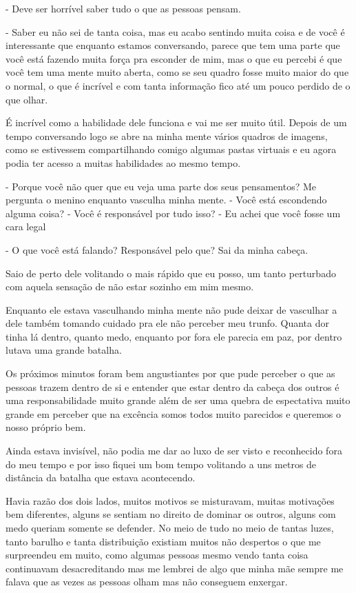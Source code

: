 - Deve ser horrível saber tudo o que as pessoas pensam.

- Saber eu não sei de tanta coisa, mas eu acabo sentindo muita coisa e de você é interessante que enquanto estamos conversando, parece que tem uma parte que você está fazendo muita força pra esconder de mim, mas o que eu percebi é que você tem uma mente muito aberta, como se seu quadro fosse muito maior do que o normal, o que é incrível e com tanta informação fico até um pouco perdido de o que olhar.

É incrível como a habilidade dele funciona e vai me ser muito útil. Depois de um tempo conversando logo se abre na minha mente vários quadros de imagens, como se estivessem compartilhando comigo algumas pastas virtuais e eu agora podia ter acesso a muitas habilidades ao mesmo tempo.

- Porque você não quer que eu veja uma parte dos seus pensamentos? Me pergunta o menino enquanto vasculha minha mente. - Você está escondendo alguma coisa? - Você é responsável por tudo isso? - Eu achei que você fosse um cara legal

- O que você está falando? Responsável pelo que? Sai da minha cabeça.

Saio de perto dele volitando o mais rápido que eu posso, um tanto perturbado com aquela sensação de não estar sozinho em mim mesmo.

Enquanto ele estava vasculhando minha mente não pude deixar de vasculhar a dele também tomando cuidado pra ele não perceber meu trunfo. Quanta dor tinha lá dentro, quanto medo, enquanto por fora ele parecia em paz, por dentro lutava uma grande batalha.

Os próximos minutos foram bem angustiantes por que pude perceber o que as pessoas trazem dentro de si e entender que estar dentro da cabeça dos outros é uma responsabilidade muito grande além de ser uma quebra de espectativa muito grande em perceber que na excência somos todos muito parecidos e queremos o nosso próprio bem.

Ainda estava invisível, não podia me dar ao luxo de ser visto e reconhecido fora do meu tempo e por isso fiquei um bom tempo volitando a uns metros de distância da batalha que estava acontecendo.

Havia razão dos dois lados, muitos motivos se misturavam, muitas motivações bem diferentes, alguns se sentiam no direito de dominar os outros, alguns com medo queriam somente se defender. No meio de tudo no meio de tantas luzes, tanto barulho e tanta distribuição existiam muitos não despertos o que me surpreendeu em muito, como algumas pessoas mesmo vendo tanta coisa continuavam desacreditando mas me lembrei de algo que minha mãe sempre me falava que as vezes as pessoas olham mas não conseguem enxergar.

